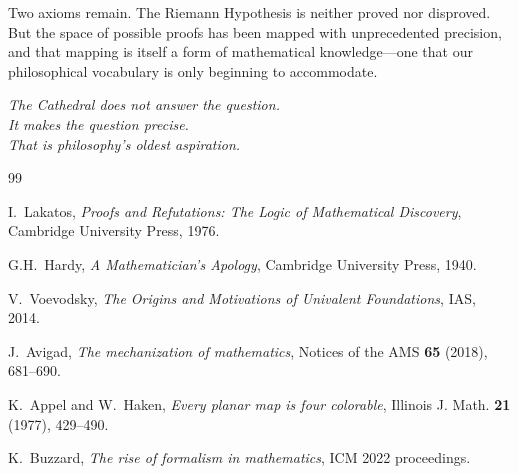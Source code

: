 \documentclass[11pt,a4paper]{article}
\begin{document}
Two axioms remain. The Riemann Hypothesis is neither proved nor
disproved. But the space of possible proofs has been mapped with
unprecedented precision, and that mapping is itself a form of
mathematical knowledge---one that our philosophical vocabulary is
only beginning to accommodate.

\vspace{1cm}
\begin{flushright}
\emph{The Cathedral does not answer the question.}\\
\emph{It makes the question precise.}\\
\emph{That is philosophy's oldest aspiration.}
\end{flushright}

\vspace{1cm}

\begin{thebibliography}{99}

I.~Lakatos, \emph{Proofs and Refutations: The Logic of Mathematical
Discovery}, Cambridge University Press, 1976.

G.H.~Hardy, \emph{A Mathematician's Apology}, Cambridge University
Press, 1940.

V.~Voevodsky, \emph{The Origins and Motivations of Univalent
Foundations}, IAS, 2014.

J.~Avigad, \emph{The mechanization of mathematics}, Notices of the
AMS \textbf{65} (2018), 681--690.

K.~Appel and W.~Haken, \emph{Every planar map is four colorable},
Illinois J. Math. \textbf{21} (1977), 429--490.

K.~Buzzard, \emph{The rise of formalism in mathematics},
ICM 2022 proceedings.

\end{thebibliography}
\end{document}
